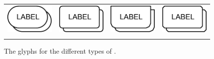 \begin{figure}[h]
\begin{tabu}{X[c,m]X[c,m]X[c,m]X[c,m]}
    \includegraphics[valign=m]{images/build/simple_chemical_multimer.pdf} & \includegraphics[valign=m]{images/build/macromolecule_multimer.pdf} & \includegraphics[valign=m]{images/build/genetic_multimer.pdf} & \includegraphics[valign=m]{images/build/complex_multimer.pdf}\\[0.5cm]
     &  &  & \\
\end{tabu}
\caption{The \PD glyphs for the different types of .}
\label{fig:multimer_containers}
\end{figure}
